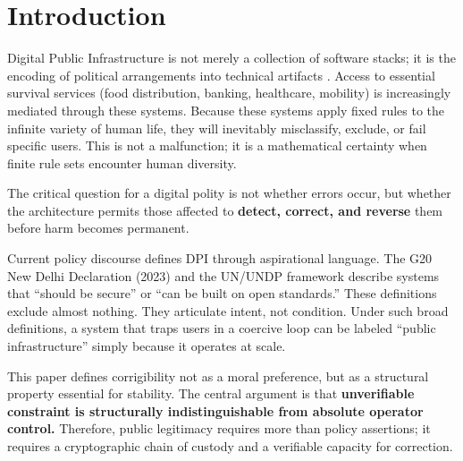 \section{Introduction}

Digital Public Infrastructure is not merely a collection of software stacks; it is the encoding of political arrangements into technical artifacts \citep{winner1980}. Access to essential survival services (food distribution, banking, healthcare, mobility) is increasingly mediated through these systems. Because these systems apply fixed rules to the infinite variety of human life, they will inevitably misclassify, exclude, or fail specific users. This is not a malfunction; it is a mathematical certainty when finite rule sets encounter human diversity.

The critical question for a digital polity is not whether errors occur, but whether the architecture permits those affected to \textbf{detect, correct, and reverse} them before harm becomes permanent.

Current policy discourse defines DPI through aspirational language. The G20 New Delhi Declaration (2023) and the UN/UNDP framework \citep{undp} describe systems that ``should be secure'' or ``can be built on open standards.'' These definitions exclude almost nothing. They articulate intent, not condition. Under such broad definitions, a system that traps users in a coercive loop can be labeled ``public infrastructure'' simply because it operates at scale.

This paper defines corrigibility not as a moral preference, but as a structural property essential for stability. The central argument is that \textbf{unverifiable constraint is structurally indistinguishable from absolute operator control.} Therefore, public legitimacy requires more than policy assertions; it requires a cryptographic chain of custody and a verifiable capacity for correction.

